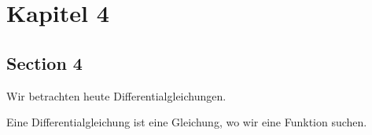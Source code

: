 \documentclass[../main.tex]{subfiles}
\begin{document}
\chapter{Kapitel 4}

\section{Section 4}

Wir betrachten heute Differentialgleichungen.
\begin{definition}
	Eine Differentialgleichung ist eine Gleichung, wo wir eine Funktion suchen.

\end{definition}
\end{document}
